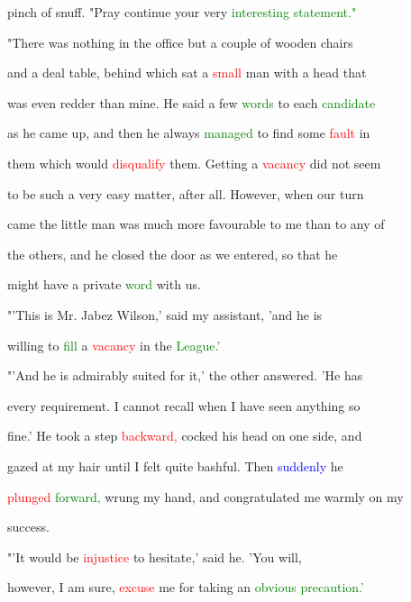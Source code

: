  pinch of snuff. \textcolor{BurntOrange}{"Pray} \textcolor{BurntOrange}{continue} your very \textcolor{green}{interesting} \textcolor{green}{statement."}



 "There was nothing in the office but a couple of wooden chairs

 and a \textcolor{BurntOrange}{deal} table, behind which sat a \textcolor{red}{small} man with a head that

 was even redder than mine. He said a few \textcolor{green}{words} to each \textcolor{green}{candidate}

 as he came up, and then he always \textcolor{green}{managed} to find some \textcolor{red}{fault} in

 them which would \textcolor{red}{disqualify} them. Getting a \textcolor{red}{vacancy} did not seem

 to be such a very easy matter, after all. However, when our turn

 came the little man was much more favourable to me than to any of

 the others, and he closed the door as we entered, so that he

 might have a private \textcolor{green}{word} with us.



 "'This is Mr. Jabez Wilson,' said my assistant, 'and he is

 willing to \textcolor{green}{fill} a \textcolor{red}{vacancy} in the \textcolor{green}{League.'}



 "'And he is admirably suited for it,' the other answered. 'He has

 every requirement. I cannot recall when I have seen anything so

 fine.' He took a step \textcolor{red}{backward,} cocked his head on one side, and

 gazed at my hair until I felt quite bashful. Then \textcolor{blue}{suddenly} he

 \textcolor{red}{plunged} \textcolor{green}{forward,} wrung my hand, and congratulated me warmly on my

 \textcolor{BurntOrange}{success.}



 "'It would be \textcolor{red}{injustice} to hesitate,' said he. 'You will,

 however, I am sure, \textcolor{red}{excuse} me for taking an \textcolor{green}{obvious} \textcolor{green}{precaution.'}

